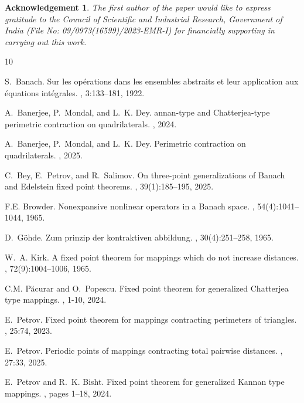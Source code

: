 \documentclass[11pt,reqno]{amsart}
\newtheorem*{Acknowledgement}{\textnormal{\textbf{Acknowledgement}}}
\theoremstyle{definition}
\newtheorem{Open Prob}[theorem]{Open Problem}
\theoremstyle{remark}
\numberwithin{equation}{section}
\begin{document}
\begin{Acknowledgement}
The first author of the paper would like to express gratitude to the Council of Scientific and Industrial Research, Government of India (File No: 09/0973(16599)/2023-EMR-I) for financially supporting in carrying out this work.  
\end{Acknowledgement}

%

\begin{thebibliography}{10}

S.~Banach.
\newblock Sur les op\'erations dans les ensembles abstraits et leur application aux \'equations int\'egrales.
, 3:133--181, 1922.

A.~Banerjee, P.~Mondal, and L.~K. Dey.
annan-type and {C}hatterjea-type perimetric contraction on quadrilaterals.
, 2024.

A.~Banerjee, P.~Mondal, and L.~K. Dey.
\newblock Perimetric contraction on quadrilaterals.
, 2025.

C.~Bey, E.~Petrov, and R.~Salimov.
\newblock On three-point generalizations of {B}anach and {E}delstein fixed point theorems.
, 39(1):185--195, 2025.

F.E. Browder.
\newblock Nonexpansive nonlinear operators in a {B}anach space.
, 54(4):1041--1044, 1965.

D.~Göhde.
\newblock Zum prinzip der kontraktiven abbildung.
, 30(4):251–258, 1965.

W.~A. Kirk.
\newblock A fixed point theorem for mappings which do not increase distances.
, 72(9):1004--1006, 1965.

C.M. P{\u{a}}curar and O.~Popescu.
\newblock Fixed point theorem for generalized {C}hatterjea type mappings.
, 1-10, 2024.

E.~Petrov.
\newblock Fixed point theorem for mappings contracting perimeters of triangles.
, 25:74, 2023.

E.~Petrov.
\newblock Periodic points of mappings contracting total pairwise distances.
, 27:33, 2025.

E.~Petrov and R.~K. Bisht.
\newblock Fixed point theorem for generalized {K}annan type mappings.
, pages 1--18, 2024.

\end{thebibliography}
\end{document}
